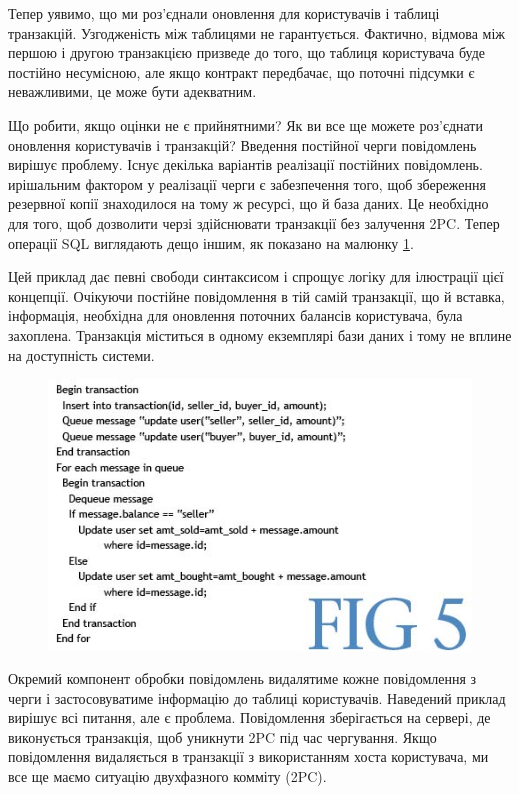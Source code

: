 \documentclass[14pt]{vakthesis}
\begin{document}
Тепер уявимо, що ми роз'єднали оновлення для користувачів і таблиці транзакцій. Узгодженість між таблицями не гарантується. Фактично, відмова між першою і другою транзакцією призведе до того, що таблиця користувача буде постійно несумісною, але якщо контракт передбачає, що поточні підсумки є неважливими, це може бути адекватним.

Що робити, якщо оцінки не є прийнятними? Як ви все ще можете роз'єднати оновлення користувачів і транзакцій? Введення постійної черги повідомлень вирішує проблему. Існує декілька варіантів реалізації постійних повідомлень. ирішальним фактором у реалізації черги є забезпечення того, щоб збереження резервної копії знаходилося на тому ж ресурсі, що й база даних. Це необхідно для того, щоб дозволити черзі здійснювати транзакції без залучення 2PC. Тепер операції SQL виглядають дещо іншим, як показано на малюнку \ref{fig:transaction_2}.

Цей приклад дає певні свободи синтаксисом і спрощує логіку для ілюстрації цієї концепції. Очікуючи постійне повідомлення в тій самій транзакції, що й вставка, інформація, необхідна для оновлення поточних балансів користувача, була захоплена. Транзакція міститься в одному екземплярі бази даних і тому не вплине на доступність системи.

\begin{figure}
\centering
\includegraphics[width=\linewidth]{images/transaction_2.jpg}
     \label{fig:transaction_2}
\end{figure}

Окремий компонент обробки повідомлень видалятиме кожне повідомлення з черги і застосовуватиме інформацію до таблиці користувачів. Наведений приклад вирішує всі питання, але є проблема. Повідомлення зберігається на сервері, де виконується транзакція, щоб уникнути 2PC під час чергування. Якщо повідомлення видаляється в транзакції з використанням хоста користувача, ми все ще маємо ситуацію двухфазного комміту (2PC).
\end{document}
